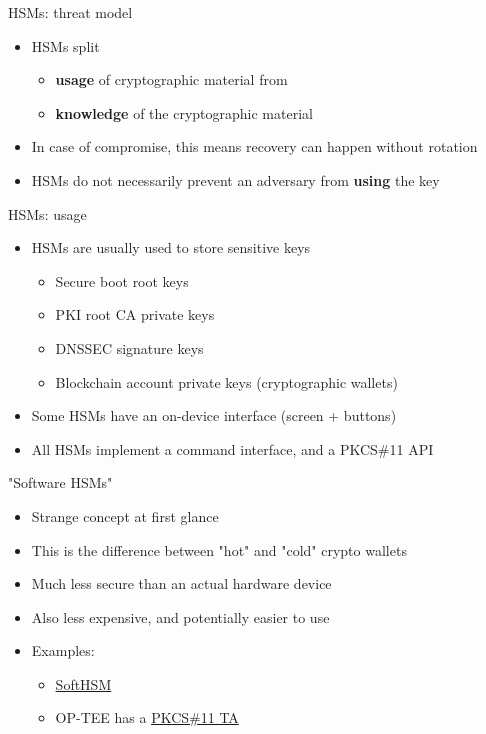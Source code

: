 \begin{frame}{HSMs: threat model}
  \begin{itemize}
    \item HSMs split 
    \begin{itemize}
      \item \textbf{usage} of cryptographic material from
      \item \textbf{knowledge} of the cryptographic material
    \end{itemize}
    \item In case of compromise, this means recovery can happen without rotation
    \item HSMs do not necessarily prevent an adversary from \textbf{using} the key
  \end{itemize}
\end{frame}

\begin{frame}{HSMs: usage}
  \begin{itemize}
    \item HSMs are usually used to store sensitive keys
    \begin{itemize}
      \item Secure boot root keys
      \item PKI root CA private keys
      \item DNSSEC signature keys
      \item Blockchain account private keys (cryptographic wallets)
    \end{itemize}
    \item Some HSMs have an on-device interface (screen + buttons)
    \item All HSMs implement a command interface, and a PKCS\#11 API
  \end{itemize}
\end{frame}

\begin{frame}{"Software HSMs"}
  \begin{itemize}
    \item Strange concept at first glance
    \item This is the difference between "hot" and "cold" crypto wallets
    \item Much less secure than an actual hardware device
    \item Also less expensive, and potentially easier to use
    \item Examples: 
    \begin{itemize}
      \item \href{https://www.softhsm.org/}{SoftHSM}
      \item OP-TEE has a \href{https://github.com/OP-TEE/optee_os/tree/master/ta/pkcs11}{PKCS\#11 TA}
    \end{itemize}
  \end{itemize}
\end{frame}

